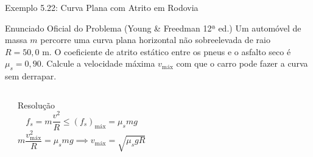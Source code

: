 \documentclass[10pt,aspectratio=169]{beamer}
\begin{document}
\begin{frame}{Exemplo 5.22: Curva Plana com Atrito em Rodovia}
    \begin{block}{Enunciado Oficial do Problema (Young \& Freedman 12ª ed.)}
        \small
        Um automóvel de massa $m$ percorre uma curva plana horizontal não sobreelevada de raio $R = 50{,}0\text{ m}$. O coeficiente de atrito estático entre os pneus e o asfalto seco é $\mu_s = 0{,}90$. Calcule a velocidade máxima $v_{\text{máx}}$ com que o carro pode fazer a curva sem derrapar.
    \end{block}
    \begin{columns}[T]
        \begin{center}
        \end{center}
        \begin{exampleblock}{Resolução}
            \small
            $$f_s = m \frac{v^2}{R} \le (f_s)_{\text{máx}} = \mu_s mg$$
            $$m \frac{v_{\text{máx}}^2}{R} = \mu_s mg \implies v_{\text{máx}} = \sqrt{\mu_s g R}$$
        \end{exampleblock}
    \end{columns}
\end{frame}
\end{document}
